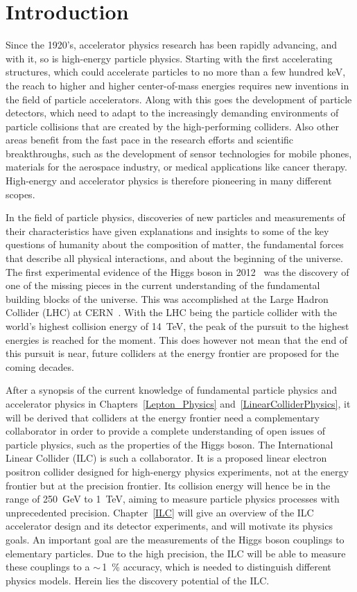 \chapter{Introduction}
\label{Introduction}
Since the 1920's, accelerator physics research has been rapidly advancing, and with it, so is high-energy particle physics.
Starting with the first accelerating structures, which could accelerate particles to no more than a few hundred \si{\keV}, the reach to higher and higher center-of-mass energies requires new inventions in the field of particle accelerators.
Along with this goes the development of particle detectors, which need to adapt to the increasingly demanding environments of particle collisions that are created by the high-performing colliders.
Also other areas benefit from the fast pace in the research efforts and scientific breakthroughs, such as the development of sensor technologies for mobile phones, materials for the aerospace industry, or medical applications like cancer therapy.
High-energy and accelerator physics is therefore pioneering in many different scopes.

In the field of particle physics, discoveries of new particles and measurements of their characteristics have given explanations and insights to some of the key questions of humanity about the composition of matter, the fundamental forces that describe all physical interactions, and about the beginning of the universe.
The first experimental evidence of the Higgs boson in 2012~\cite{Higgs,Higgs2} was the discovery of one of the missing pieces in the current understanding of the fundamental building blocks of the universe.
This was accomplished at the Large Hadron Collider (LHC) at CERN~\cite{LHC_CERN}.
With the LHC being the particle collider with the world's highest collision energy of \SI{14}{\TeV}, the peak of the pursuit to the highest energies is reached for the moment.
This does however not mean that the end of this pursuit is near, future colliders at the energy frontier are proposed for the coming decades.

After a synopsis of the current knowledge of fundamental particle physics and accelerator physics in Chapters~\ref{Lepton_Physics} and~\ref{LinearColliderPhysics}, it will be derived that colliders at the energy frontier need a complementary collaborator in order to provide a complete understanding of open issues of particle physics, such as the properties of the Higgs boson.
The International Linear Collider (ILC) is such a collaborator.
It is a proposed linear electron positron collider designed for high-energy physics experiments, not at the energy frontier but at the precision frontier.
Its collision energy will hence be in the range of \SI{250}{\GeV} to \SI{1}{\TeV}, aiming to measure particle physics processes with unprecedented precision.
Chapter~\ref{ILC} will give an overview of the ILC accelerator design and its detector experiments, and will motivate its physics goals.
An important goal are the measurements of the Higgs boson couplings to elementary particles.
Due to the high precision, the ILC will be able to measure these couplings to a $\sim$\,\SI{1}{\percent} accuracy, which is needed to distinguish different physics models.
Herein lies the discovery potential of the ILC.

